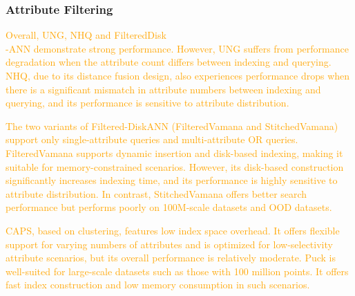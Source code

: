 \documentclass[sigconf, nonacm]{acmart}
\begin{document}
{\begin{table}[htbp]
\end{table}

	
	\subsubsection{Attribute Filtering}
\textcolor{orange}{
Overall, UNG, NHQ and FilteredDisk\\-ANN demonstrate strong performance. However, UNG suffers from performance degradation when the attribute count differs between indexing and querying. NHQ, due to its distance fusion design, also experiences performance drops when there is a significant mismatch in attribute numbers between indexing and querying, and its performance is sensitive to attribute distribution. }

\textcolor{orange}{The two variants of Filtered-DiskANN (FilteredVamana and StitchedVamana) support only single-attribute queries and multi-attribute OR queries. FilteredVamana supports dynamic insertion and disk-based indexing, making it suitable for memory-constrained scenarios. However, its disk-based construction significantly increases indexing time, and its performance is highly sensitive to attribute distribution. In contrast, StitchedVamana offers better search performance but performs poorly on 100M-scale datasets and OOD datasets.}

\textcolor{orange}{
CAPS, based on clustering, features low index space overhead. It offers flexible support for varying numbers of attributes and is optimized for low-selectivity attribute scenarios, but its overall performance is relatively moderate.
Puck is well-suited for large-scale datasets such as those with 100 million points. It offers fast index construction and low memory consumption in such scenarios. 
}


}
\end{document}
